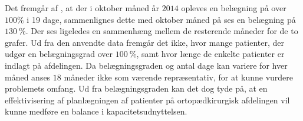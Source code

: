 \noindent
Det fremgår af , at der i oktober måned år $2014$ opleves en belægning på over $100\%$ i 19 dage, sammenlignes dette med oktober måned på  ses en belægning på $130~\%$. Der ses ligeledes en sammenhæng mellem de resterende måneder for de to grafer. 
Ud fra den anvendte data fremgår det ikke, hvor mange patienter, der udgør en belægningsgrad over $100~\%$, samt hvor længe de enkelte patienter er indlagt på afdelingen. Da belægningsgraden og antal dage kan variere for hver måned anses $18$ måneder ikke som værende repræsentativ, for at kunne vurdere problemets omfang. Ud fra belægningsgraden kan det dog tyde på, at en effektivisering af planlægningen af patienter på ortopædkirurgisk afdelingen vil kunne medføre en balance i kapacitetsudnyttelsen.